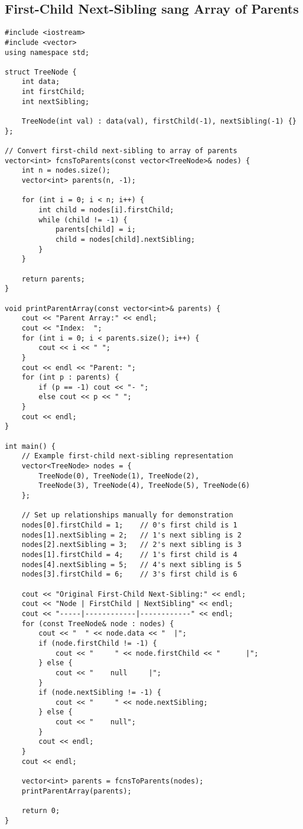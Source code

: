 \documentclass[12pt]{article}
\begin{document}
\subsection{First-Child Next-Sibling sang Array of Parents}

\begin{lstlisting}[caption={Chuyển đổi từ First-Child Next-Sibling sang Array of Parents}]
#include <iostream>
#include <vector>
using namespace std;

struct TreeNode {
    int data;
    int firstChild;
    int nextSibling;
    
    TreeNode(int val) : data(val), firstChild(-1), nextSibling(-1) {}
};

// Convert first-child next-sibling to array of parents
vector<int> fcnsToParents(const vector<TreeNode>& nodes) {
    int n = nodes.size();
    vector<int> parents(n, -1);
    
    for (int i = 0; i < n; i++) {
        int child = nodes[i].firstChild;
        while (child != -1) {
            parents[child] = i;
            child = nodes[child].nextSibling;
        }
    }
    
    return parents;
}

void printParentArray(const vector<int>& parents) {
    cout << "Parent Array:" << endl;
    cout << "Index:  ";
    for (int i = 0; i < parents.size(); i++) {
        cout << i << " ";
    }
    cout << endl << "Parent: ";
    for (int p : parents) {
        if (p == -1) cout << "- ";
        else cout << p << " ";
    }
    cout << endl;
}

int main() {
    // Example first-child next-sibling representation
    vector<TreeNode> nodes = {
        TreeNode(0), TreeNode(1), TreeNode(2), 
        TreeNode(3), TreeNode(4), TreeNode(5), TreeNode(6)
    };
    
    // Set up relationships manually for demonstration
    nodes[0].firstChild = 1;    // 0's first child is 1
    nodes[1].nextSibling = 2;   // 1's next sibling is 2
    nodes[2].nextSibling = 3;   // 2's next sibling is 3
    nodes[1].firstChild = 4;    // 1's first child is 4
    nodes[4].nextSibling = 5;   // 4's next sibling is 5
    nodes[3].firstChild = 6;    // 3's first child is 6
    
    cout << "Original First-Child Next-Sibling:" << endl;
    cout << "Node | FirstChild | NextSibling" << endl;
    cout << "-----|------------|------------" << endl;
    for (const TreeNode& node : nodes) {
        cout << "  " << node.data << "  |";
        if (node.firstChild != -1) {
            cout << "     " << node.firstChild << "      |";
        } else {
            cout << "    null     |";
        }
        if (node.nextSibling != -1) {
            cout << "     " << node.nextSibling;
        } else {
            cout << "    null";
        }
        cout << endl;
    }
    cout << endl;
    
    vector<int> parents = fcnsToParents(nodes);
    printParentArray(parents);
    
    return 0;
}
\end{lstlisting}
\end{document}

